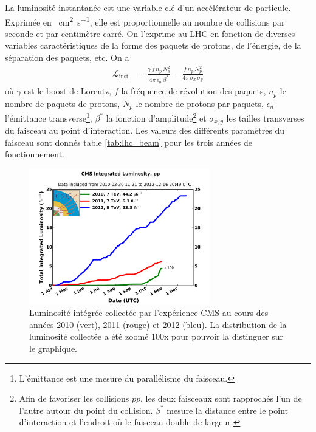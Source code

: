 La luminosité instantanée est une variable clé d'un accélérateur de particule. Exprimée en \si{\per\square\cm\per\second}, elle est proportionnelle au nombre de collisions par seconde et par centimètre carré. On l'exprime au LHC en fonction de diverses variables caractéristiques de la forme des paquets de protons,
de l'énergie, de la séparation des paquets, etc. On a
\begin{align*}
  \mathcal{L}_{\text{inst}} &= \frac{\gamma\,f\,n_p\,N_p^2}{4\pi\,\epsilon_n\,\beta^*} = \frac{f\,n_p\,N_p^2}{4\pi\,\sigma_x\,\sigma_y}
\end{align*}
où $\gamma$ est le boost de Lorentz, $f$ la fréquence de révolution des paquets, $n_p$ le nombre de paquets de protons, $N_p$ le nombre de protons par paquets, $\epsilon_n$ l'émittance transverse\footnote{L'émittance est une mesure du parallélisme du faisceau.}, $\beta^*$ la fonction d'amplitude\footnote{Afin de favoriser les collisions $pp$, les deux faisceaux sont rapprochés l'un de l'autre autour du point du collision. $\beta^*$ mesure la distance entre le point d'interaction et l'endroit où le faisceau double de largeur.} et $\sigma_{x,y}$ les tailles transverses du faisceau au point d'interaction. Les valeurs des différents paramètres du faisceau sont donnés table \ref{tab:lhc_beam} pour les trois années de fonctionnement.

\begin{figure} \centering
  \includegraphics[width=0.7\textwidth]{chapitre2/figs/CMS_lumi.pdf}
  \caption{Luminosité intégrée collectée par l'expérience CMS au cours des années 2010 (vert), 2011 (rouge) et 2012 (bleu). La distribution de la luminosité collectée a été zoomé 100x pour pouvoir la distinguer sur le graphique.}
  \label{fig:lumi}
\end{figure}

